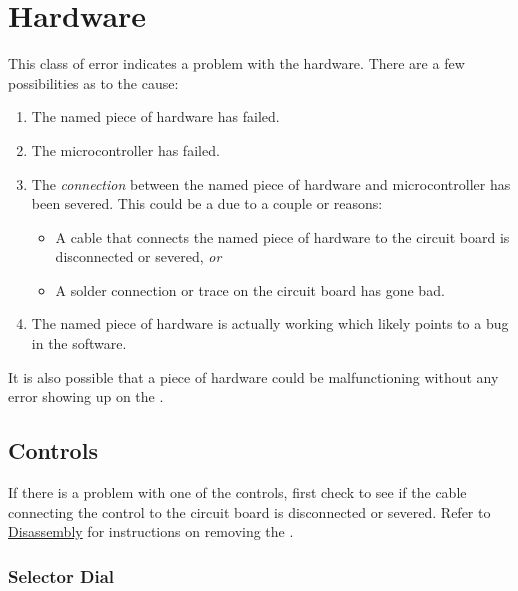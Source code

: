 \section{Hardware}

This class of error indicates a problem with the hardware.  There are a
few possibilities as to the cause:

\begin{enumerate}
  \item The named piece of hardware has failed.
  \item The microcontroller has failed.
  \item The \textit{connection} between the named piece of hardware and
    microcontroller has been severed.  This could be a due to a couple
    or reasons:
    \begin{itemize}
      \item A cable that connects the named piece of hardware to the
        circuit board is disconnected or severed, \textit{or}
      \item A solder connection or trace on the circuit board has gone bad.
    \end{itemize}
  \item The named piece of hardware is actually working which likely points to a
    bug in the software.
\end{enumerate}

It is also possible that a piece of hardware could be malfunctioning without
any error showing up on the .

\subsection{Controls}

If there is a problem with one of the controls, first check to see if the
cable connecting the control to the circuit board is disconnected or severed.
Refer to \hyperref[Disassembly]{Disassembly} for instructions on removing the
.

\subsubsection{Selector Dial}

